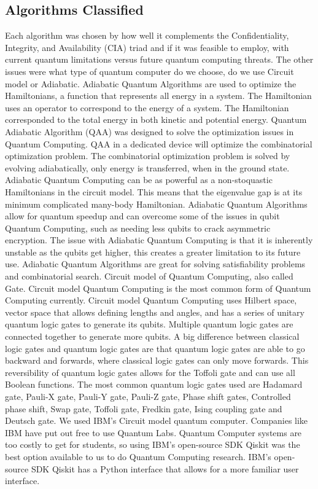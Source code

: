 \documentclass[sigconf]{acmart}
\begin{document}
\subsection{Algorithms Classified}
Each algorithm was chosen by how well it complements the Confidentiality, Integrity, and Availability (CIA) triad and if it was feasible to employ, with current quantum limitations versus future quantum computing threats. The other issues were what type of quantum computer do we choose, do we use Circuit model or Adiabatic. Adiabatic Quantum Algorithms are used to optimize the Hamiltonians, a function that represents all energy in a system. The Hamiltonian uses an operator to correspond to the energy of a system. The Hamiltonian corresponded to the total energy in both kinetic and potential energy. Quantum Adiabatic Algorithm (QAA) was designed to solve the optimization issues in Quantum Computing. QAA in a dedicated device will optimize the combinatorial optimization problem. The combinatorial optimization problem is solved by evolving adiabatically, only energy is transferred, when in the ground state. Adiabatic Quantum Computing can be as powerful as a non-stoquastic Hamiltonians in the circuit model. This means that the eigenvalue gap is at its minimum complicated many-body Hamiltonian. Adiabatic Quantum Algorithms allow for quantum speedup and can overcome some of the issues in qubit Quantum Computing, such as needing less qubits to crack asymmetric encryption. The issue with Adiabatic Quantum Computing is that it is inherently unstable as the qubits get higher, this creates a greater limitation to its future use. Adiabatic Quantum Algorithms are great for solving satisfiability problems and combinatorial search. Circuit model of Quantum Computing, also called Gate. Circuit model Quantum Computing is the most common form of Quantum Computing currently. Circuit model Quantum Computing uses Hilbert space, vector space that allows defining lengths and angles, and has a series of unitary quantum logic gates to generate its qubits. Multiple quantum logic gates are connected together to generate more qubits. A big difference between classical logic gates and quantum logic gates are that quantum logic gates are able to go backward and forwards, where classical logic gates can only move forwards. This reversibility of quantum logic gates allows for the Toffoli gate and can use all Boolean functions. The most common quantum logic gates used are Hadamard gate, Pauli-X gate, Pauli-Y gate, Pauli-Z gate, Phase shift gates, Controlled phase shift, Swap gate, Toffoli gate, Fredkin gate, Ising coupling gate and Deutsch gate. We used IBM’s Circuit model quantum computer. Companies like IBM have put out free to use Quantum Labs. Quantum Computer systems are too costly to get for students, so using IBM’s open-source SDK Qiskit was the best option available to us to do Quantum Computing research. IBM’s open-source SDK Qiskit has a Python interface that allows for a more familiar user interface.
\end{document}

